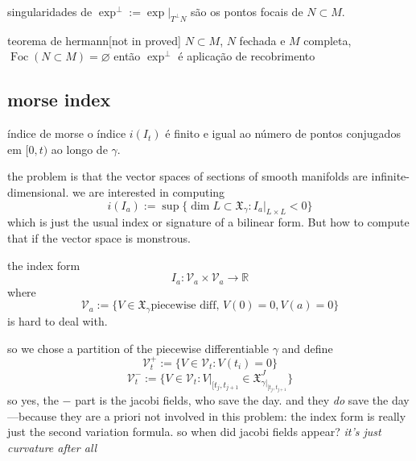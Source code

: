 \begin{prop}\leavevmode
singularidades de \(\operatorname{exp}^\perp:=\operatorname{exp}|_{T^\perp N}\) são os pontos focais de \(N \subset M\).
\end{prop}

\begin{thing6}{teorema de hermann}[not in proved]\leavevmode
\(N \subset M\), \(N\) fechada e \(M\) completa, \(\operatorname{Foc}(N \subset M)=\varnothing\) então \(\operatorname{exp}^\perp\) é aplicação de recobrimento
\end{thing6}

\subsection{morse index}

\begin{thing6}{índice de morse}\leavevmode
o índice \(i(I_t)\) é finito e igual ao número de pontos conjugados em \([0,t)\) ao longo de \(\gamma\).
\end{thing6}
the problem is that the vector spaces of sections of smooth manifolds are infinite-dimensional. we are interested in computing
\[i(I_a):=\operatorname{sup}\{\dim L \subset \mathfrak{X}_\gamma:I_a |_{L \times L}<0\}\]
which is just the usual index or signature of a bilinear form. But how to compute that if the vector space is monstrous.

the index form
\[I_a:\mathcal{V}_a \times \mathcal{V}_a \longrightarrow \mathbb{R}\]
where
\[\mathcal{V}_a:=\{V \in \mathfrak{X}_\gamma \text{piecewise diff, }V(0)=0,V(a)=0\}\]
is hard to deal with.

so we chose a partition of the piecewise differentiable \(\gamma\) and define
\[\mathcal{V}_t^+:=\{V \in \mathcal{V}_t: V(t_i)=0\}\]
\[\mathcal{V}_t^-:=\{V \in \mathcal{V}_t:V|_{[t_j,t_{j+1}}\in \mathfrak{X}^J_{\gamma|_{[t_j,t_{j+1}}}\}\]
so yes, the \(-\) part is the jacobi fields, who save the day. and they \textit{do} save the day---because they are a priori not involved in this problem: the index form is really just the second variation formula. so when did jacobi fields appear? \textit{it's just curvature after all}

